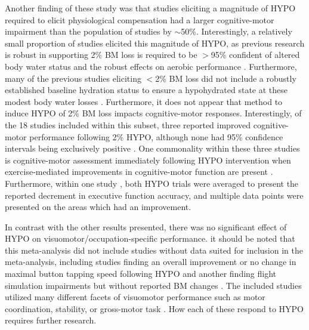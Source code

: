 Another finding of these study was that studies eliciting a magnitude of HYPO required to elicit physiological compensation \cite{cheuvront_dehydration:_2014} had a larger cognitive-motor impairment than the population of studies by ${\sim}$50\%. Interestingly, a relatively small proportion of studies elicited this magnitude of HYPO, as previous research is robust in supporting 2\% BM loss is required to be ${>}$95\% confident of altered body water status \cite{cheuvront_biological_2010} and the robust effects on aerobic performance \cite{sawka_hypohydration_2015, sawka_american_2007}. Furthermore, many of the previous studies \cite{wittbrodt_exercise-induced_2015,weber_dehydration_2013} eliciting $<$2\% BM loss did not include a robustly established baseline hydration status to ensure a hypohydrated state at these modest body water losses \cite{cheuvront_dehydration:_2014,cheuvront_daily_2004}. Furthermore, it does not appear that method to induce HYPO of 2\% BM loss impacts cognitive-motor responses. Interestingly, of the 18 studies included within this subset, three reported improved cognitive-motor performance following 2\% HYPO, although none had 95\% confidence intervals being exclusively positive \cite{van_den_heuvel_independent_2017,kakos_improving_2013,tomporowski_effects_2007}. One commonality within these three studies \cite{tomporowski_effects_2007,kakos_improving_2013} is cognitive-motor assessment immediately following HYPO intervention when exercise-mediated improvements in cognitive-motor function are present \cite{chang_effects_2012}. Furthermore, within one study \cite{tomporowski_effects_2007}, both HYPO trials were averaged to present the reported decrement in executive function accuracy, and multiple data points were presented on the areas which had an improvement.  

In contrast with the other results presented, there was no significant effect of HYPO on visuomotor/occupation-specific performance. it should be noted that this meta-analysis did not include studies without data suited for inclusion in the meta-analysis, including studies finding an overall improvement \cite{bandelow_effects_2010} or no change \cite{cian_effects_2001, hogervorst_cognitive_1996} in maximal button tapping speed following HYPO and another finding flight simulation impairments but without reported BM changes \cite{lindseth_effects_2013}. The included studies utilized many different facets of visuomotor performance such as motor coordination, stability, or gross-motor task \cite{turner_mild_2017}. How each of these respond to HYPO requires further research.


